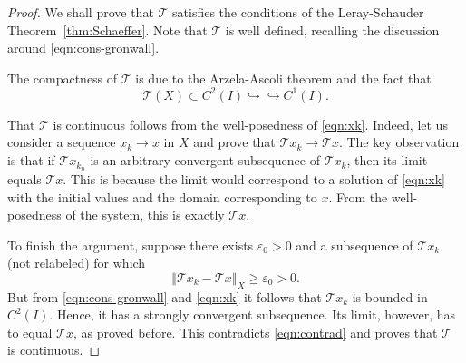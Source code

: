 \documentclass[10pt,a4paper]{article}
\numberwithin{equation}{section}
\begin{document}
\begin{proof}
We shall prove that $\mathcal{T}$ satisfies the conditions of the  Leray-Schauder Theorem~\ref{thm:Schaeffer}. Note that $\mathcal{T}$ is well defined, recalling the discussion around \eqref{eqn:cons-gronwall}.

The compactness of $\mathcal{T}$ is due to the Arzela-Ascoli theorem and the fact that
\[
\mathcal{T}\left(X\right)\subset C^{2}\left(I\right)\hookrightarrow\hookrightarrow C^{1}\left(I\right).
\] 

That $\mathcal{T}$ is continuous follows from the well-posedness of \eqref{eqn:xk}. 
Indeed, let us consider a sequence $x_{k}\to x$ in $X$ and prove that $\mathcal{T}x_{k}\to\mathcal{T}x$.
The key observation is that if $\mathcal{T}x_{k_{n}}$ is an arbitrary convergent subsequence of $\mathcal{T}x_{k}$, then its limit equals $\mathcal{T}x$. This is because the limit would correspond to a solution of \eqref{eqn:xk} with the initial values and the domain corresponding to $x$. From the well-posedness of the system, this is exactly $\mathcal{T}x$.

To finish the argument, suppose there exists $\varepsilon_0>0$ and a subsequence of $\mathcal{T}x_{k}$ (not relabeled) for which 
\begin{equation}\label{eqn:contrad}
\left\Vert \mathcal{T}x_{k}-\mathcal{T}x\right\Vert _{X}\ge\varepsilon_{0}>0.
\end{equation}
But from \eqref{eqn:cons-gronwall} and \eqref{eqn:xk} it follows that $\mathcal{T}x_{k}$ is bounded in $C^{2}\left(I\right)$. Hence, it has a strongly convergent subsequence. Its limit, however, has to equal $\mathcal{T}x$, as proved before. This contradicts \eqref{eqn:contrad} and proves that $\mathcal{T}$ is continuous.


\end{proof}
\end{document}
